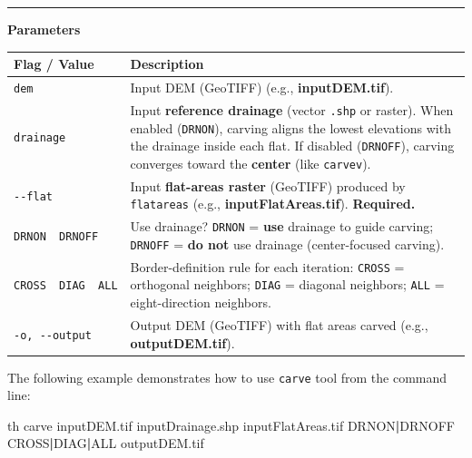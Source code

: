 \documentclass[
]{book}
\newenvironment{Shaded}{\begin{snugshade}}{\end{snugshade}}
\newcommand{\ExtensionTok}[1]{#1}
\newcommand{\KeywordTok}[1]{\textcolor[rgb]{0.13,0.29,0.53}{\textbf{#1}}}
\newcommand{\NormalTok}[1]{#1}
\theoremstyle{definition}
\theoremstyle{definition}
\theoremstyle{definition}
\theoremstyle{definition}
\theoremstyle{remark}
\begin{document}
\begin{center}\rule{0.5\linewidth}{0.5pt}\end{center}

\textbf{Parameters}

\begin{longtable}[]{@{}
  >{\raggedright\arraybackslash}p{}
  >{\raggedright\arraybackslash}p{}@{}}
\toprule\noalign{}
\begin{minipage}[b]{\linewidth}\raggedright
Flag / Value
\end{minipage} & \begin{minipage}[b]{\linewidth}\raggedright
Description
\end{minipage} \\
\midrule\noalign{}
\endhead
\bottomrule\noalign{}
\endlastfoot
\texttt{dem} & Input DEM (GeoTIFF) (e.g., \textbf{inputDEM.tif}). \\
\texttt{drainage} & Input \textbf{reference drainage} (vector \texttt{.shp} or raster). When enabled (\texttt{DRNON}), carving aligns the lowest elevations with the drainage inside each flat. If disabled (\texttt{DRNOFF}), carving converges toward the \textbf{center} (like \texttt{carvev}). \\
\texttt{-\/-flat} & Input \textbf{flat-areas raster} (GeoTIFF) produced by \texttt{flatareas} (e.g., \textbf{inputFlatAreas.tif}). \textbf{Required.} \\
\texttt{DRNON\ \textbar{}\ DRNOFF} & Use drainage? \texttt{DRNON} = \textbf{use} drainage to guide carving; \texttt{DRNOFF} = \textbf{do not} use drainage (center-focused carving). \\
\texttt{CROSS\ \textbar{}\ DIAG\ \textbar{}\ ALL} & Border-definition rule for each iteration: \texttt{CROSS} = orthogonal neighbors; \texttt{DIAG} = diagonal neighbors; \texttt{ALL} = eight-direction neighbors. \\
\texttt{-o,\ -\/-output} & Output DEM (GeoTIFF) with flat areas carved (e.g., \textbf{outputDEM.tif}). \\
\end{longtable}

The following example demonstrates how to use \texttt{carve} tool from the command line:

\begin{Shaded}
\begin{Highlighting}[]
\ExtensionTok{th}\NormalTok{ carve inputDEM.tif inputDrainage.shp inputFlatAreas.tif DRNON}\KeywordTok{|}\ExtensionTok{DRNOFF}\NormalTok{ CROSS}\KeywordTok{|}\ExtensionTok{DIAG}\KeywordTok{|}\ExtensionTok{ALL}\NormalTok{ outputDEM.tif}
\end{Highlighting}
\end{Shaded}
\end{document}
